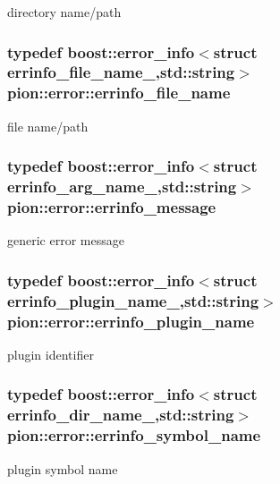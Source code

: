 directory name/path 

\hypertarget{namespacepion_1_1error_a5526ef1c3e6ab8db270a0d49a66a5782}{
\subsubsection[{errinfo\-\_\-file\-\_\-name}]{\setlength{\rightskip}{0pt plus 5cm}typedef boost\-::error\-\_\-info$<$struct errinfo\-\_\-file\-\_\-name\-\_\-,std\-::string$>$ {\bf pion\-::error\-::errinfo\-\_\-file\-\_\-name}}}\label{namespacepion_1_1error_a5526ef1c3e6ab8db270a0d49a66a5782}


file name/path 

\hypertarget{namespacepion_1_1error_a5ee8b972a03980d77e8abf0c12349449}{
\subsubsection[{errinfo\-\_\-message}]{\setlength{\rightskip}{0pt plus 5cm}typedef boost\-::error\-\_\-info$<$struct errinfo\-\_\-arg\-\_\-name\-\_\-,std\-::string$>$ {\bf pion\-::error\-::errinfo\-\_\-message}}}\label{namespacepion_1_1error_a5ee8b972a03980d77e8abf0c12349449}


generic error message 

\hypertarget{namespacepion_1_1error_a7327ab3a3df1bd5f5ca8fb259260da2f}{
\subsubsection[{errinfo\-\_\-plugin\-\_\-name}]{\setlength{\rightskip}{0pt plus 5cm}typedef boost\-::error\-\_\-info$<$struct errinfo\-\_\-plugin\-\_\-name\-\_\-,std\-::string$>$ {\bf pion\-::error\-::errinfo\-\_\-plugin\-\_\-name}}}\label{namespacepion_1_1error_a7327ab3a3df1bd5f5ca8fb259260da2f}


plugin identifier 

\hypertarget{namespacepion_1_1error_a13c185094e103a8c0bb136923ccfa717}{
\subsubsection[{errinfo\-\_\-symbol\-\_\-name}]{\setlength{\rightskip}{0pt plus 5cm}typedef boost\-::error\-\_\-info$<$struct errinfo\-\_\-dir\-\_\-name\-\_\-,std\-::string$>$ {\bf pion\-::error\-::errinfo\-\_\-symbol\-\_\-name}}}\label{namespacepion_1_1error_a13c185094e103a8c0bb136923ccfa717}


plugin symbol name 

